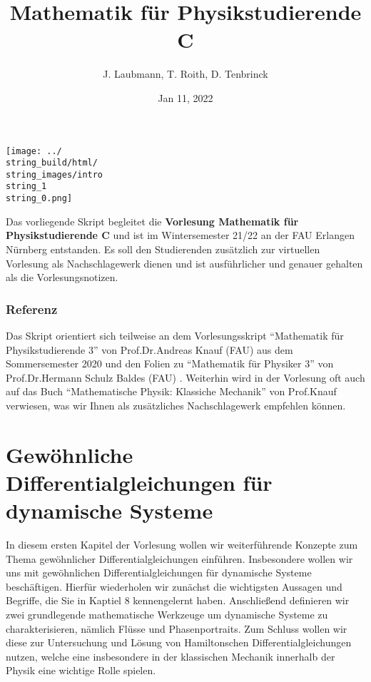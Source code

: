 \documentclass[letterpaper,10pt,english]{jupyterBook}
\title{Mathematik für Physikstudierende C}
\date{Jan 11, 2022}
\author{J.\@{} Laubmann, T.\@{} Roith, D.\@{} Tenbrinck}
\begin{document}
\label{\detokenize{intro::doc}}


\noindent\texttt{[image: ../\\string\_build/html/\\string\_images/intro\\string\_1\\string\_0.png]}

\par
Das vorliegende Skript begleitet die \textbf{Vorlesung Mathematik für Physikstudierende C} und ist im Wintersemester 21/22 an der FAU Erlangen Nürnberg entstanden. Es soll den Studierenden zusätzlich zur virtuellen Vorlesung als Nachschlagewerk dienen und ist ausführlicher und genauer gehalten als die Vorlesungsnotizen.

\subsection{Referenz}

\par
Das Skript orientiert sich teilweise an dem Vorlesungsskript “Mathematik für Physikstudierende 3” \cite{Kna20} von Prof.Dr.Andreas Knauf (FAU) aus dem Sommersemester 2020 und den Folien zu “Mathematik für Physiker 3” von Prof.Dr.Hermann Schulz Baldes (FAU) \cite{SB18}. Weiterhin wird in der Vorlesung oft auch auf das Buch “Mathematische Physik: Klassiche Mechanik” \cite{Kna17} von Prof.Knauf verwiesen, was wir Ihnen als zusätzliches Nachschlagewerk empfehlen können.


\chapter{Gewöhnliche Differentialgleichungen für dynamische Systeme}
\label{\detokenize{ode/ode:gewohnliche-differentialgleichungen-fur-dynamische-systeme}}\label{\detokenize{ode/ode::doc}}
\par
In diesem ersten Kapitel der Vorlesung wollen wir weiterführende Konzepte zum Thema gewöhnlicher Differentialgleichungen einführen.
Insbesondere wollen wir uns mit gewöhnlichen Differentialgleichungen für dynamische Systeme beschäftigen.
Hierfür wiederholen wir zunächst die wichtigsten Aussagen und Begriffe, die Sie in Kaptiel 8 \cite{Ten21} kennengelernt haben.
Anschließend definieren wir zwei grundlegende mathematische Werkzeuge um dynamische Systeme zu charakterisieren, nämlich Flüsse und Phasenportraits.
Zum Schluss wollen wir diese zur Untersuchung und Lösung von Hamiltonschen Differentialgleichungen nutzen, welche eine insbesondere in der klassischen Mechanik innerhalb der Physik eine wichtige Rolle spielen.
\end{document}

